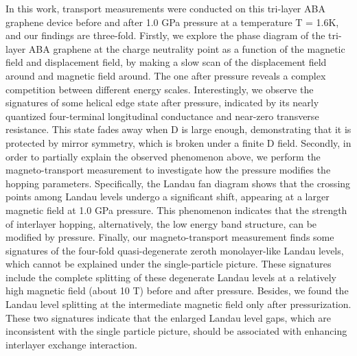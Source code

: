 In this work, transport measurements were conducted on this tri-layer ABA graphene device before and after 1.0 GPa pressure at a temperature T = 1.6K, and our findings are three-fold. 
Firstly, we explore the phase diagram of the tri-layer ABA graphene at the charge neutrality point as a function of the magnetic field and displacement field, 
by making a slow scan of the displacement field around and magnetic field around. 
The one after pressure reveals a complex competition between different energy scales. 
Interestingly, we observe the signatures of some helical edge state after pressure, indicated by its nearly quantized four-terminal longitudinal conductance and near-zero transverse resistance. 
This state fades away when D is large enough, demonstrating that it is protected by mirror symmetry, which is broken under a finite D field. 
Secondly, in order to partially explain the observed phenomenon above, we perform the magneto-transport measurement to investigate how the pressure modifies the hopping parameters. 
Specifically, the Landau fan diagram shows that the crossing points among Landau levels undergo a significant shift, appearing at a larger magnetic field at 1.0 GPa pressure. 
This phenomenon indicates that the strength of interlayer hopping, alternatively, the low energy band structure, can be modified by pressure. 
Finally, our magneto-transport measurement finds some signatures of the four-fold quasi-degenerate zeroth monolayer-like Landau levels, which cannot be explained under the single-particle picture. 
These signatures include the complete splitting of these degenerate Landau levels at a relatively high magnetic field (about 10 T) before and after pressure. 
Besides, we found the Landau level splitting at the intermediate magnetic field only after pressurization. 
These two signatures indicate that the enlarged Landau level gaps, which are inconsistent with the single particle picture, should be associated with enhancing interlayer exchange interaction.
